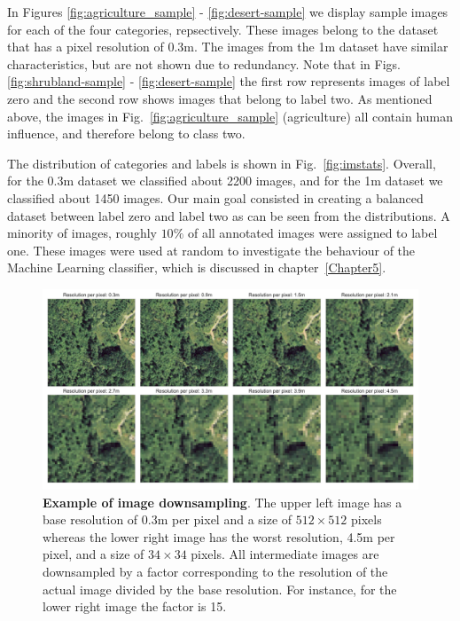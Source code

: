 In Figures \ref{fig:agriculture_sample} - \ref{fig:desert-sample} we display sample images for each of the four categories, repsectively. These images belong to the dataset that has a pixel resolution of 0.3m. The images from the 1m dataset have similar characteristics, but are not shown due to redundancy. Note that in Figs. \ref{fig:shrubland-sample} - \ref{fig:desert-sample} the first row represents images of label zero and the second row shows images that belong to label two. As mentioned above, the images in Fig.~\ref{fig:agriculture_sample} (agriculture) all contain human influence, and therefore belong to class two. 

The distribution of categories and labels is shown in Fig.~\ref{fig:imstats}. Overall, for the 0.3m dataset we classified about 2200 images, and for the 1m dataset we classified about 1450 images. Our main goal consisted in creating a balanced dataset between label zero and label two as can be seen from the distributions. A minority of images, roughly $10\%$ of all annotated images were assigned to label one. These images were used at random to investigate the behaviour of the Machine Learning classifier, which is discussed in chapter~\ref{Chapter5}.

\begin{figure}[h!]
	\centering
	\captionsetup{width=1\linewidth}
	\includegraphics[width=1\textwidth]{Figures/demo_degrade.pdf}
	\caption{\textbf{Example of image downsampling}. The upper left image has a base resolution of 0.3m per pixel and a size of $512\times512$ pixels whereas the lower right image has the worst resolution, 4.5m per pixel, and a size of $34\times34$ pixels. All intermediate images are downsampled by a factor corresponding to the resolution of the actual image divided by the base resolution. For instance, for the lower right image the factor is 15.}
	\label{fig:degrade}
\end{figure}

